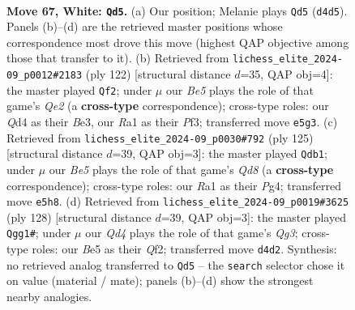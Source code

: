 \documentclass[11pt]{article}
\begin{document}
\clearpage

\begin{figure}[p]\centering
\begin{subfigure}{0.46\textwidth}\centering
\resizebox{\linewidth}{!}{%
\newchessgame
\chessboard[
  setfen={2k5/8/8/p3Bp2/P2Q4/8/8/RN4K1 w - - 1 67},
  showmover=false,
  pgfstyle=straightmove, color=movearrow, markmove={d4-d5}
]}
\caption{}
\end{subfigure}\hfill
\begin{subfigure}{0.46\textwidth}\centering
\resizebox{\linewidth}{!}{%
\newchessgame
\chessboard[
  setfen={8/5p2/1K6/4p2p/7P/4BP2/4Q3/7k w - - 2 62},
  showmover=false,
  pgfstyle=straightmove, color=movearrow, markmove={e2-f2}
]}
\caption{}
\end{subfigure}
\\[4pt]
\begin{subfigure}{0.46\textwidth}\centering
\resizebox{\linewidth}{!}{%
\newchessgame
\chessboard[
  setfen={8/8/7p/5k1P/6p1/K7/2q5/3q4 b - - 5 63},
  showmover=false,
  pgfstyle=straightmove, color=movearrow, markmove={d1-b1}
]}
\caption{}
\end{subfigure}\hfill
\begin{subfigure}{0.46\textwidth}\centering
\resizebox{\linewidth}{!}{%
\newchessgame
\chessboard[
  setfen={8/2K5/8/8/p7/P5Q1/5Q2/k7 w - - 7 65},
  showmover=false,
  pgfstyle=straightmove, color=movearrow, markmove={g3-g1}
]}
\caption{}
\end{subfigure}
\caption{\textbf{Move 67, White: \texttt{Qd5}.} (a) Our position; Melanie plays \texttt{Qd5} (\texttt{d4d5}). Panels (b)--(d) are the retrieved master positions whose correspondence most drove this move (highest QAP objective among those that transfer to it). (b) Retrieved from \texttt{lichess\_elite\_2024-09\_p0012\#2183} (ply 122) [structural distance $d$=35, QAP obj=4]: the master played \texttt{Qf2}; under $\mu$ our \emph{Be5} plays the role of that game's \emph{Qe2} (a \textbf{cross-type} correspondence); cross-type roles: our \emph{Q}d4 as their \emph{B}e3, our \emph{R}a1 as their \emph{P}f3; transferred move \texttt{e5g3}. (c) Retrieved from \texttt{lichess\_elite\_2024-09\_p0030\#792} (ply 125) [structural distance $d$=39, QAP obj=3]: the master played \texttt{Qdb1}; under $\mu$ our \emph{Be5} plays the role of that game's \emph{Qd8} (a \textbf{cross-type} correspondence); cross-type roles: our \emph{R}a1 as their \emph{P}g4; transferred move \texttt{e5h8}. (d) Retrieved from \texttt{lichess\_elite\_2024-09\_p0019\#3625} (ply 128) [structural distance $d$=39, QAP obj=3]: the master played \texttt{Qgg1\#}; under $\mu$ our \emph{Qd4} plays the role of that game's \emph{Qg3}; cross-type roles: our \emph{B}e5 as their \emph{Q}f2; transferred move \texttt{d4d2}. Synthesis: no retrieved analog transferred to \texttt{Qd5} -- the \texttt{search} selector chose it on value (material / mate); panels (b)--(d) show the strongest nearby analogies.}
\label{fig:thought-m132}
\end{figure}
\end{document}
